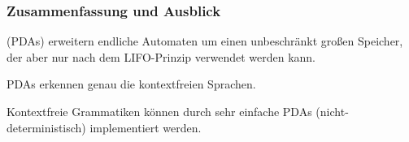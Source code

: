 \documentclass[aspectratio=1610,onlymath]{beamer}
\begin{document}
\begin{frame}\frametitle{Zusammenfassung und Ausblick}

 (PDAs) erweitern endliche Automaten um einen unbeschränkt großen Speicher,
der aber nur nach dem LIFO-Prinzip verwendet werden kann.
\bigskip

PDAs erkennen genau die kontextfreien Sprachen.
\bigskip

Kontextfreie Grammatiken können durch sehr einfache PDAs (nicht-deterministisch) implementiert werden.\bigskip


\end{frame}
\end{document}
